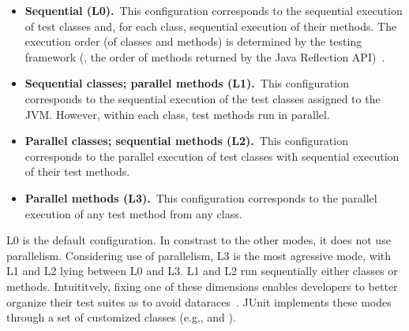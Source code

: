\newcommand{\Seq}{L0}
\newcommand{\ParClassSeqMeth}{L1}
\newcommand{\SeqClassParMeth}{L2}
\newcommand{\ParClassParMeth}{L3}

\begin{itemize}
\item
    \textbf{Sequential (\Seq).}~This configuration corresponds to the
    sequential execution of test classes and, for each class,
    sequential execution of their methods.  The execution order (of
    classes and methods) is determined by the testing framework (\eg,
    the order of methods returned by the Java Reflection
    API)~\cite{junit-test-order}.
\item
    \textbf{Sequential classes; parallel methods
      (\ParClassSeqMeth{}).}~This configuration corresponds to the
    sequential execution of the test classes assigned to the JVM.
    However, within each class, test methods run in parallel.
\item
    \textbf{Parallel classes; sequential methods
      (\SeqClassParMeth{}).}~This configuration corresponds to the
    parallel execution of test classes with sequential execution of
    their test methods.
\item
    \textbf{Parallel methods (\ParClassParMeth).}~This configuration
    corresponds to the parallel execution of any test method from any
    class.
\end{itemize}

\Seq{} is the default configuration.  In constrast to the other modes,
it does not use parallelism.  Considering use of parallelism,
\ParClassParMeth{} is the most agressive mode, with \ParClassSeqMeth{}
and \SeqClassParMeth{} lying between \Seq{} and \ParClassParMeth{}.
\ParClassSeqMeth{} and \SeqClassParMeth{} run sequentially either
classes or methods.  Intuititvely, fixing one of these dimensions
enables developers to better organize their test suites as to avoid
dataraces~.  JUnit implements these modes through a set of
customized classes (e.g.,  and
).


